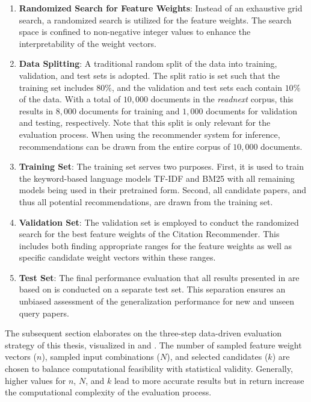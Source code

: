 \begin{enumerate}
    \item \textbf{Randomized Search for Feature Weights}: Instead of an exhaustive grid search, a randomized search is utilized for the feature weights. The search space is confined to non-negative integer values to enhance the interpretability of the weight vectors.
    \item \textbf{Data Splitting}: A traditional random split of the data into training, validation, and test sets is adopted. The split ratio is set such that the training set includes $80\%$, and the validation and test sets each contain $10\%$ of the data. With a total of $10,000$ documents in the \emph{readnext} corpus, this results in $8,000$ documents for training and $1,000$ documents for validation and testing, respectively. Note that this split is only relevant for the evaluation process. When using the recommender system for inference, recommendations can be drawn from the entire corpus of $10,000$ documents.
    \item \textbf{Training Set}: The training set serves two purposes. First, it is used to train the keyword-based language models TF-IDF and BM25 with all remaining models being used in their pretrained form.
          Second, all candidate papers, and thus all potential recommendations, are drawn from the training set.
    \item \textbf{Validation Set}: The validation set is employed to conduct the randomized search for the best feature weights of the Citation Recommender. This includes both finding appropriate ranges for the feature weights as well as specific candidate weight vectors within these ranges.
    \item \textbf{Test Set}: The final performance evaluation that all results presented in  are based on is conducted on a separate test set.
          This separation ensures an unbiased assessment of the generalization performance for new and unseen query papers.
\end{enumerate}

The subsequent section elaborates on the three-step data-driven evaluation strategy of this thesis, visualized in  and .
The number of sampled feature weight vectors ($n$), sampled input combinations ($N$), and selected candidates ($k$) are chosen to balance computational feasibility with statistical validity.
Generally, higher values for $n$, $N$, and $k$ lead to more accurate results but in return increase the computational complexity of the evaluation process.

